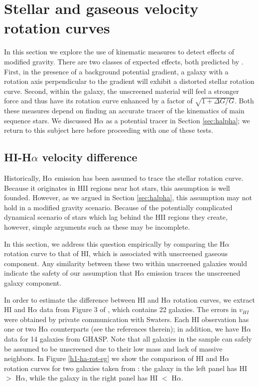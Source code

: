\documentclass[useAMS,usenatbib,twocolumn]{mn2e}
\newcommand{\ha}{H$\alpha$}
\begin{document}
\section{Stellar and gaseous velocity rotation curves}
\label{sec:rotationcurves}

In this section we explore the use of kinematic measures to detect
effects of modified gravity.  There are two classes of expected effects,
both predicted by \citet{bhuvjake2011}.
First, in the presence of a background potential gradient, a galaxy
with a rotation axis perpendicular to the gradient will exhibit a distorted
stellar rotation curve.  Second, within the galaxy, the unscreened material
will feel a stronger force and thus have its rotation curve enhanced by
a factor of $\sqrt{1 + \Delta G/G}$.  Both these measures depend on finding
an accurate tracer of the kinematics of main sequence stars.  We discussed
\ha{} as a potential tracer in Section \ref{sec:halpha}; we return to this
subject here before proceeding with one of these tests.

\subsection{HI-\ha{} velocity difference}
\label{sec:hihalpha}

Historically, \ha{} emission has been assumed to trace the stellar rotation
curve.  Because it originates in HII regions near hot stars, this assumption
is well founded.  However, as we argued in Section \ref{sec:halpha}, this
assumption may not hold in a modified gravity scenario.  Because of the
potentially complicated dynamical scenario of stars which lag behind the HII
regions they create, however, simple arguments such as these may be incomplete.

In this section, we address this question empirically
by comparing the \ha{} rotation curve to that of HI, which is
associated with unscreened gaseous component. Any similarity between
these two within unscreened galaxies would indicate the safety of our
assumption that \ha{} emission traces the unscreened galaxy component.

In order to estimate the difference between HI and \ha{} rotation
curves, we extract HI and \ha{} data from Figure 3 of \citet{Swaters2009}, which
contains 22 galaxies. The errors in $v_{HI}$ were obtained by private
communication with Swaters.  Each HI observation has one or two \ha{}
counterparts (see the references therein); in addition, we have \ha{} data for
14 galaxies from GHASP. Note that all galaxies in the sample can safely be
assumed to be unscreened due
to their low mass and lack of massive neighbors. In Figure \ref{h1-ha-rot-eg} we
show the comparison of HI and \ha{} rotation curves for two galaxies taken from
\citet{Swaters2009}: the galaxy in the left panel has HI $>$ \ha{}, while the
galaxy in the right panel has HI $<$ \ha{}.
\end{document}
